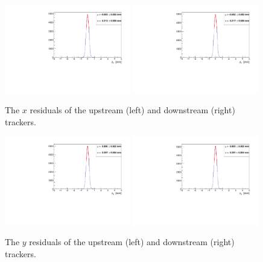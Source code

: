     \begin{figure}[p]
    \begin{center}
      \includegraphics[width=0.49\textwidth, angle=0]{08-Performance/upstream_x_residual.pdf}
      \includegraphics[width=0.49\textwidth, angle=0]{08-Performance/downstream_x_residual.pdf}
      \caption{\label{fig:XResidKalman} The $x$ residuals of the upstream (left) and downstream (right) trackers.}
    \end{center}
  \end{figure}
  
    \begin{figure}[p]
    \begin{center}
      \includegraphics[width=0.49\textwidth, angle=0]{08-Performance/upstream_y_residual.pdf}
      \includegraphics[width=0.49\textwidth, angle=0]{08-Performance/downstream_y_residual.pdf}
      \caption{\label{fig:YResidKalman} The $y$ residuals of the upstream (left) and downstream (right) trackers.}
    \end{center}
  \end{figure} 
  
